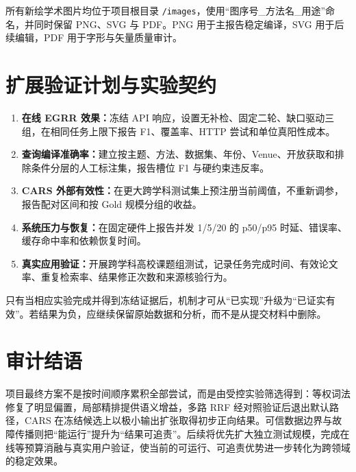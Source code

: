 \documentclass[a4paper,11pt,fontset=none]{ctexart}
\begin{document}
所有新绘学术图片均位于项目根目录 \texttt{/images}，使用“图序号\_方法名\_用途”命名，并同时保留 PNG、SVG 与 PDF。PNG 用于主报告稳定编译，SVG 用于后续编辑，PDF 用于字形与矢量质量审计。

\section{扩展验证计划与实验契约}

\begin{enumerate}
  \item \textbf{在线 EGRR 效果：}冻结 API 响应，设置无补检、固定二轮、缺口驱动三组，在相同任务上限下报告 F1、覆盖率、HTTP 尝试和单位真阳性成本。
  \item \textbf{查询编译准确率：}建立按主题、方法、数据集、年份、Venue、开放获取和排除条件分层的人工标注集，报告槽位 F1 与硬约束违反率。
  \item \textbf{CARS 外部有效性：}在更大跨学科测试集上预注册当前阈值，不重新调参，报告配对区间和按 Gold 规模分组的收益。
  \item \textbf{系统压力与恢复：}在固定硬件上报告并发 1/5/20 的 p50/p95 时延、错误率、缓存命中率和依赖恢复时间。
  \item \textbf{真实应用验证：}开展跨学科高校课题组测试，记录任务完成时间、有效论文率、重复检索率、结果修正次数和来源核验行为。
\end{enumerate}

只有当相应实验完成并得到冻结证据后，机制才可从“已实现”升级为“已证实有效”。若结果为负，应继续保留原始数据和分析，而不是从提交材料中删除。

\section{审计结语}

项目最终方案不是按时间顺序累积全部尝试，而是由受控实验筛选得到：等权词法修复了明显偏置，局部精排提供语义增益，多路 RRF 经对照验证后退出默认路径，CARS 在冻结候选上以极小输出扩张取得初步正向结果。可信数据边界与故障传播则把“能运行”提升为“结果可追责”。后续将优先扩大独立测试规模，完成在线等预算消融与真实用户验证，使当前的可运行、可追责优势进一步转化为跨领域的稳定效果。
\end{document}
